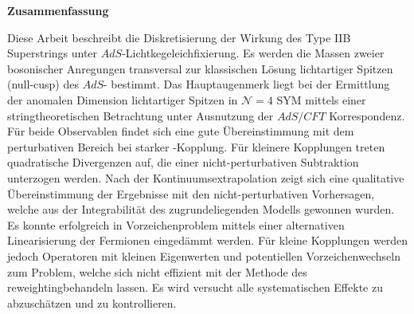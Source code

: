 %
\begin{center}
{\sffamily \bfseries\Large Zusammenfassung}\\
\end{center}%
\vspace{1cm}
%
Diese Arbeit beschreibt die Diskretisierung der Wirkung des Type IIB  Superstrings unter $AdS$-Lichtkegeleichfixierung. Es werden die Massen zweier bosonischer Anregungen transversal zur klassischen Lösung lichtartiger Spitzen (null-cusp) des $AdS$- bestimmt. Das Hauptaugenmerk liegt bei der Ermittlung der anomalen Dimension lichtartiger Spitzen in $\mathcal{N}=4$ SYM mittels einer stringtheoretischen Betrachtung unter Ausnutzung der \linebreak $AdS/CFT$ Korrespondenz. Für beide Observablen findet sich eine gute Übereinstimmung mit dem perturbativen Bereich bei starker -Kopplung. Für kleinere Kopplungen treten quadratische Divergenzen auf, die einer nicht-perturbativen Subtraktion unterzogen werden. Nach der Kontinuumsextrapolation zeigt sich eine qualitative Übereinstimmung der Ergebnisse mit den nicht-perturbativen Vorhersagen, welche aus der Integrabilität des zugrundeliegenden Modells gewonnen wurden. Es konnte erfolgreich in Vorzeichenproblem mittels einer alternativen Linearisierung der Fermionen eingedämmt werden. Für kleine Kopplungen werden jedoch Operatoren mit kleinen Eigenwerten und potentiellen Vorzeichenwechseln zum Problem, welche sich nicht effizient mit der Methode des \glqq reweighting\grqq{ }behandeln lassen. Es wird versucht alle systematischen Effekte zu abzuschätzen und zu kontrollieren.
